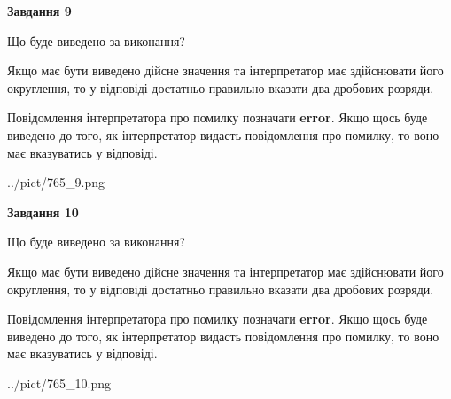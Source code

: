 \documentclass[12pt, ukrainian]{article}
\begin{document}
{\begin {Large}
{\begin {center}\textbf{Завдання 9}\end {center}}\par
Що буде виведено за виконання? \par

Якщо має бути виведено дійсне значення та інтерпретатор має здійснювати його округлення, 
то у відповіді достатньо правильно вказати два дробових розряди.

Повідомлення інтерпретатора про помилку позначати \textbf{error}.
Якщо щось буде виведено до того, як інтерпретатор видасть повідомлення про помилку, 
то воно має вказуватись у відповіді. \par

\begin{center}
	{../pict/765_9.png}
\end{center}
\newpage

{\begin {center}\textbf{Завдання 10}\end {center}}\par
Що буде виведено за виконання? \par

Якщо має бути виведено дійсне значення та інтерпретатор має здійснювати його округлення, 
то у відповіді достатньо правильно вказати два дробових розряди.

Повідомлення інтерпретатора про помилку позначати \textbf{error}.
Якщо щось буде виведено до того, як інтерпретатор видасть повідомлення про помилку, 
то воно має вказуватись у відповіді. \par

\begin{center}
	{../pict/765_10.png}
\end{center}
\newpage

\end {Large}}
\end{document}
